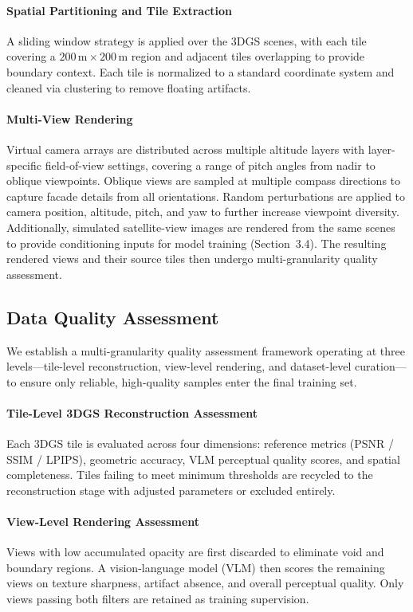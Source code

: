 \paragraph{Spatial Partitioning and Tile Extraction}
A sliding window strategy is applied over the 3DGS scenes, with each tile covering a $200\,\text{m} \times 200\,\text{m}$ region and adjacent tiles overlapping to provide boundary context. Each tile is normalized to a standard coordinate system and cleaned via clustering to remove floating artifacts.

\paragraph{Multi-View Rendering}
Virtual camera arrays are distributed across multiple altitude layers with layer-specific field-of-view settings, covering a range of pitch angles from nadir to oblique viewpoints. Oblique views are sampled at multiple compass directions to capture facade details from all orientations. Random perturbations are applied to camera position, altitude, pitch, and yaw to further increase viewpoint diversity. Additionally, simulated satellite-view images are rendered from the same scenes to provide conditioning inputs for model training (Section~3.4). The resulting rendered views and their source tiles then undergo multi-granularity quality assessment.

\subsection{Data Quality Assessment}
\label{sec:quality}

We establish a multi-granularity quality assessment framework operating at three levels---tile-level reconstruction, view-level rendering, and dataset-level curation---to ensure only reliable, high-quality samples enter the final training set.

\paragraph{Tile-Level 3DGS Reconstruction Assessment}
Each 3DGS tile is evaluated across four dimensions: reference metrics (PSNR / SSIM / LPIPS), geometric accuracy, VLM perceptual quality scores, and spatial completeness. Tiles failing to meet minimum thresholds are recycled to the reconstruction stage with adjusted parameters or excluded entirely.

\paragraph{View-Level Rendering Assessment}
Views with low accumulated opacity are first discarded to eliminate void and boundary regions. A vision-language model (VLM) then scores the remaining views on texture sharpness, artifact absence, and overall perceptual quality. Only views passing both filters are retained as training supervision.


